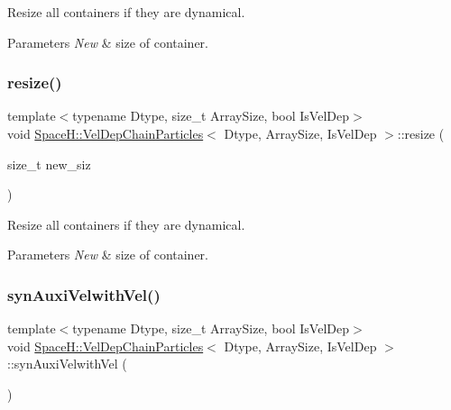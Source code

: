 Resize all containers if they are dynamical. 


\begin{DoxyParams}{Parameters}
{\em New} & size of container. \\
\hline
\end{DoxyParams}
\mbox{\label{class_space_h_1_1_vel_dep_chain_particles_a8cc7751b890724be0bf72471cb65d761}} 
\subsubsection{\texorpdfstring{resize()}{resize()}\hspace{0.1cm}{\footnotesize\ttfamily [2/2]}}
{\footnotesize\ttfamily template$<$typename Dtype, size\+\_\+t Array\+Size, bool Is\+Vel\+Dep$>$ \\
void \mbox{\hyperlink{class_space_h_1_1_vel_dep_chain_particles}{Space\+H\+::\+Vel\+Dep\+Chain\+Particles}}$<$ Dtype, Array\+Size, Is\+Vel\+Dep $>$\+::resize (\begin{DoxyParamCaption}\item[{size\+\_\+t}]{new\+\_\+siz }\end{DoxyParamCaption})\hspace{0.3cm}{\ttfamily [inline]}}



Resize all containers if they are dynamical. 


\begin{DoxyParams}{Parameters}
{\em New} & size of container. \\
\hline
\end{DoxyParams}
\mbox{\label{class_space_h_1_1_vel_dep_chain_particles_a0d32d36439671d1c2344178d1d548567}} 
\subsubsection{\texorpdfstring{syn\+Auxi\+Velwith\+Vel()}{synAuxiVelwithVel()}\hspace{0.1cm}{\footnotesize\ttfamily [1/2]}}
{\footnotesize\ttfamily template$<$typename Dtype, size\+\_\+t Array\+Size, bool Is\+Vel\+Dep$>$ \\
void \mbox{\hyperlink{class_space_h_1_1_vel_dep_chain_particles}{Space\+H\+::\+Vel\+Dep\+Chain\+Particles}}$<$ Dtype, Array\+Size, Is\+Vel\+Dep $>$\+::syn\+Auxi\+Velwith\+Vel (\begin{DoxyParamCaption}{ }\end{DoxyParamCaption})\hspace{0.3cm}{\ttfamily [inline]}}



